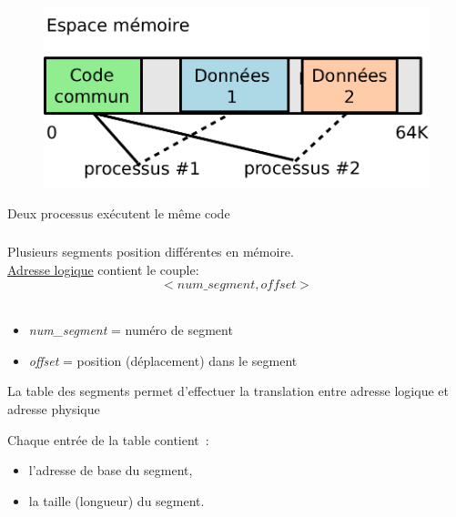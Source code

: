 \begin{frame}
\frametitle{\insertsubsection}
\begin{figure}
  \includegraphics[width=0.8\linewidth]{fig2/seg1}
\end{figure}
Deux processus exécutent le même code
\end{frame}

\begin{frame}
\frametitle{\insertsubsection}
Plusieurs \alert{segments}  position différentes en mémoire.\\
\vspace{0.5cm}
\underline{Adresse logique} contient le couple:
\alert{$$<num\_segment, offset>$$}\\
\vspace{-0.4cm}
\begin{itemize}
\item \emph{num\_segment} = \alert{numéro de segment}
\item \emph{offset} = position (déplacement) dans le segment
\end{itemize}
\vspace{0.3cm}
La \alert{table des segments} permet d'effectuer la translation entre adresse logique
et adresse physique\\
\vspace{0.3cm}

Chaque entrée de la table contient~:
\begin{itemize}
\item l'\alert{adresse de base} du segment,
\item la \alert{taille} (longueur) du segment.
\end{itemize}

\end{frame}

